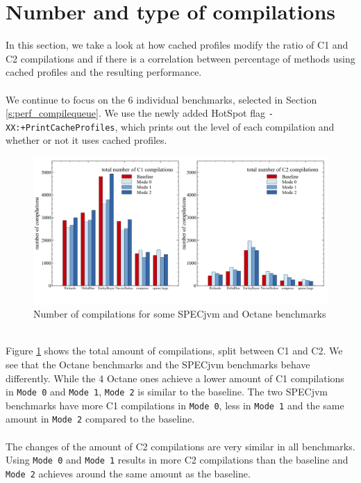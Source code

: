 \section{Number and type of compilations}
\label{s:perf_compilenumber}
In this section, we take a look at how cached profiles modify the ratio of C1 and C2 compilations and if there is a correlation between percentage of methods using cached profiles and the resulting performance.
\\\\
We continue to focus on the 6 individual benchmarks, selected in Section \ref{s:perf_compilequeue}.
We use the newly added HotSpot flag \texttt{-XX:+PrintCacheProfiles}, which prints out the level of each compilation and whether or not it uses cached profiles.
\begin{figure}[ht!]
  \begin{center}
    \centering
    \includegraphics[width=1.0\textwidth]{figures/queue_total.png}
    \caption{Number of compilations for some SPECjvm and Octane benchmarks}
    \label{f:queue_total}
  \end{center}
\end{figure}
\\
Figure \ref{f:queue_total} shows the total amount of compilations, split between C1 and C2.
We see that the Octane benchmarks and the SPECjvm benchmarks behave differently. While the 4 Octane ones achieve a lower amount of C1 compilations in \texttt{Mode 0} and \texttt{Mode 1}, \texttt{Mode 2} is similar to the baseline. The two SPECjvm benchmarks have more C1 compilations in \texttt{Mode 0}, less in \texttt{Mode 1} and the same amount in \texttt{Mode 2} compared to the baseline.
\\\\
The changes of the amount of C2 compilations are very similar in all benchmarks. Using \texttt{Mode 0} and \texttt{Mode 1} results in more C2 compilations than the baseline and \texttt{Mode 2} achieves around the same amount as the baseline.
